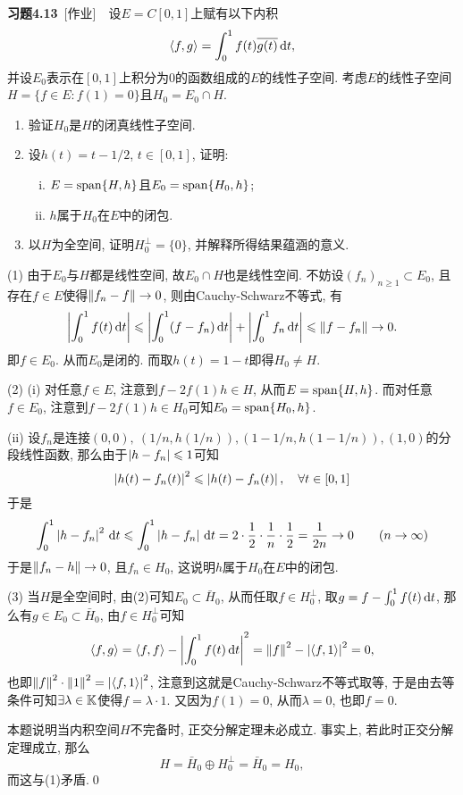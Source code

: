 	\textbf{习题4.13}\ [作业]\ \ 设$ E=C[0,1] $上赋有以下内积
	\[
	\left\langle f,g \right\rangle=\int_0^1f(t)\overline{g(t)}\,\mathrm{d} t,
	\]
	并设$ E_0 $表示在$ [0,1] $上积分为0的函数组成的$ E $的线性子空间. 考虑$ E $的线性子空间$ H=\{ f\in E : f(1)=0 \} $且$ H_0=E_0\cap H $.
	\begin{enumerate}[(1)]
	\item 验证$ H_0 $是$ H $的闭真线性子空间.
	\item 设$ h(t)=t-1/2 $, $ t\in[0,1] $, 证明:
	\begin{enumerate}[(i)]
	\item $ E=\operatorname{span}\{H,h\} $且$ E_0=\operatorname{span}\{H_0,h\} $;
	\item $ h $属于$ H_0 $在$ E $中的闭包.
	\end{enumerate}
	\item 以$ H $为全空间, 证明$ H_0^\bot=\{0\} $, 并解释所得结果蕴涵的意义.
	\end{enumerate}
	\begin{Proof}
	(1) 由于$ E_0 $与$ H $都是线性空间, 故$ E_0\cap H $也是线性空间. 不妨设$ (f_n)_{n\geqslant 1}\subset E_0 $, 且存在$ f\in E $使得$ \left\| f_n-f \right\|\to 0 $, 则由Cauchy-Schwarz不等式, 有
	\[
	\left| \int_0^1f(t)\,\mathrm{d} t \right| \leqslant\left| \int_0^1(f-f_n)\,\mathrm{d} t \right| +\left| \int_0^1f_n\,\mathrm{d} t \right| \leqslant\left\| f-f_n \right\|\to 0.
	\]
	即$ f\in E_0 $. 从而$ E_0 $是闭的. 而取$ h(t)=1-t $即得$ H_0\ne H $.
	
	(2) (i) 对任意$ f\in E $, 注意到$ f-2f(1)h\in H $, 从而$ E=\operatorname{span}\{ H,h \} $. 而对任意$ f\in E_0 $, 注意到$ f-2f(1)h\in H_0 $可知$ E_0=\operatorname{span}\{ H_0,h \} $.
	
	(ii) 设$ f_n $是连接$ (0,0),\ (1/n,h(1/n)), (1-1/n,h(1-1/n)), (1,0) $的分段线性函数, 那么由于$ \left| h-f_n \right| \leqslant 1 $可知
	\[
	\left| h(t)-f_n(t) \right| ^2\leqslant\left| h(t)-f_n(t) \right| ,\quad\forall t\in [0,1]
	\]
	于是
	\[
	\int_0^1\left| h-f_n \right| ^2\,\mathrm{d} t\leqslant\int_0^1\left| h-f_n \right| \,\mathrm{d} t=2\cdot\frac{1}{2}\cdot\frac{1}{n}\cdot\frac{1}{2}=\frac{1}{2n}\to 0\qquad (n\to\infty)
	\]
	于是$ \left\| f_n-h \right\|\to 0 $, 且$ f_n\in H_0 $, 这说明$ h $属于$ H_0 $在$ E $中的闭包.
	
	(3) 当$ H $是全空间时, 由(2)可知$ E_0\subset\bar{H}_0 $, 从而任取$ f\in H_0^\bot $, 取$ g=f-\int_0^1f(t)\,\mathrm{d} t $, 那么有$ g\in E_0\subset \bar{H}_0 $, 由$ f\in H_0^\bot $可知
	\[
	\left\langle f,g \right\rangle=\left\langle f,f \right\rangle-\left| \int_0^1f(t)\,\mathrm{d} t \right| ^2=\left\| f \right\|^2-\left| \left\langle f,1 \right\rangle \right| ^2=0,
	\]
	也即$ \left\| f \right\|^2\cdot\left\| 1 \right\|^2=\left| \left\langle f,1 \right\rangle \right| ^2 $, 注意到这就是Cauchy-Schwarz不等式取等, 于是由去等条件可知$ \exists\lambda\in\mathbb{K} $使得$ f=\lambda\cdot 1 $. 又因为$ f(1)=0 $, 从而$ \lambda=0 $, 也即$ f=0 $.
	
	本题说明当内积空间$ H $不完备时, 正交分解定理未必成立. 事实上, 若此时正交分解定理成立, 那么
	\[
	H=\bar{H}_0\oplus H_0^\bot=\bar{H}_0=H_0,
	\]
	而这与(1)矛盾.\qed
	\end{Proof}
	
